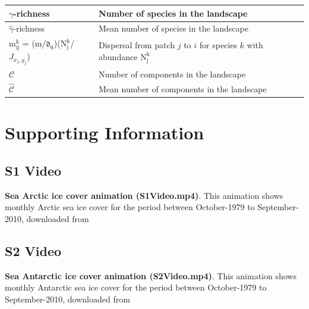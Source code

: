 \documentclass[a4paper,12pt]{article}
\begin{document}
\begin{table}[!ht]
\begin{tabular}{  p{5cm}  |  p{12cm} }
  $\gamma$-richness & Number of species in the landscape \\ \hline
  $\hat{\gamma}$-richness & Mean number of species in the landscape \\ \hline
  $\mathrm{m^{k}_{ij}}$ = ($\mathrm{m}$/$\mathfrak{d_{ij}}$)($\mathrm{N^{k}_{j}}$/$J_{x_j,y_j}$) & Dispersal from patch $j$ to $i$ for species $k$ with abundance $\mathrm{N^{k}_{j}}$ \\ \hline
  $\mathcal{C}$ & Number of components in the landscape \\ \hline
  $\hat{\mathcal{C}}$ & Mean number of components in the landscape  \\ \hline
\end{tabular}
\label{table2}
\end{table}

\newpage
\clearpage
\section*{Supporting Information}

\subsection*{S1 Video}
\label{S1_Video}
{\textbf{Sea Arctic ice cover animation (S1\underline{\hspace{.1in}}Video.mp4)}}. This animation shows monthly Arctic sea ice cover for the period between October-1979 to September-2010, downloaded from \citep{cavalierietal1996}\\

\subsection*{S2 Video}
\label{S2_Video}
\textbf{Sea Antarctic ice cover animation (S2\underline{\hspace{.1in}}Video.mp4)}. This animation shows monthly Antarctic sea ice cover for the period between October-1979 to September-2010, downloaded from \citep{cavalierietal1996}\\
\end{document}
